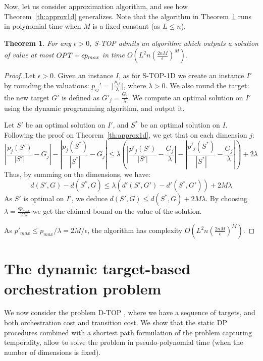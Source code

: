 \documentclass[a4paper]{book}
\newtheorem{theorem}{Theorem}[chapter]
\newtheorem{proof}{\noindent{\bf Proof.} }
\newcommand{\stat}{{\sc S-TOP }}
\newcommand{\statoned}{{\sc S-TOP-1D }}
\newcommand{\dyn}{{\sc D-TOP }}
\begin{document}
Now, let us consider approximation algorithm, and see how Theorem~\ref{th:approx1d} generalizes. Note that the algorithm in Theorem~\ref{th:stop} runs in polynomial time when $M$ is a fixed constant (as $L\leq n$).

\begin{theorem}\label{th:stop}
For any $\epsilon>0$, \stat admits an algorithm which outputs a solution of value at most ${\sc OPT}+\epsilon p_{max}$ in time $O\left(L^2n\left(\frac{2nM}{\epsilon}\right)^M\right)$.
\end{theorem}

\begin{proof}
Let $\epsilon>0$. Given an instance $I$, as for \statoned we create an instance  $I'$ by rounding the valuations: $p_{ij}'= \lfloor \frac{p_{ij} }{\lambda} \rfloor$, where $\lambda>0$. We also round the target: the new target $G'$ is defined as $G'_j =\frac{G_j}{\lambda}$. We compute an optimal solution on $I'$ using the dynamic programming algorithm, and output it. 

Let $S'$ be an optimal solution on $I'$, and $S^*$ be an optimal solution on $I$. Following the proof on Theorem~\ref{th:approx1d}, we get that  on each dimension $j$:
\begin{equation}
\left|\frac{p_j(S')}{|S'|}-G_j\right|-\left|\frac{p_j(S^*)}{|S^*|}-G_j\right| \leq\lambda \left(\left|\frac{p'_j(S')}{|S'|} - \frac{G_j}{\lambda}\right| - \left|\frac{p'_j(S^*)}{|S^*|}-\frac{G_j}{\lambda}\right|\right) + 2\lambda
\end{equation}
Thus, by summing on the dimensions, we have:
\begin{equation}\nonumber
d(S',G)-d(S^*,G) \leq\lambda \left(d'(S',G') - d'(S^*,G')\right) + 2M\lambda
\end{equation}
As $S'$ is optimal on $I'$, we deduce $d(S',G)\leq d(S^*,G)+2M\lambda$. By choosing $\lambda=\frac{\epsilon p_{max}}{2M}$ we get the claimed bound on the value of the solution.

As $p'_{max}\leq p_{max}/\lambda=2M/\epsilon$, the algorithm has complexity $O\left(L^2n\left(\frac{2nM}{\epsilon}\right)^M\right)$.


\end{proof}

\section{The dynamic target-based orchestration problem}\label{sec:dyn}

We now consider the problem \dyn, where we have a sequence of targets, and both orchestration cost and transition cost. We show that the static DP procedures combined with a shortest path formulation of the problem capturing temporality, allow to solve the problem in pseudo-polynomial time (when the number of dimensions is fixed).
\end{document}
